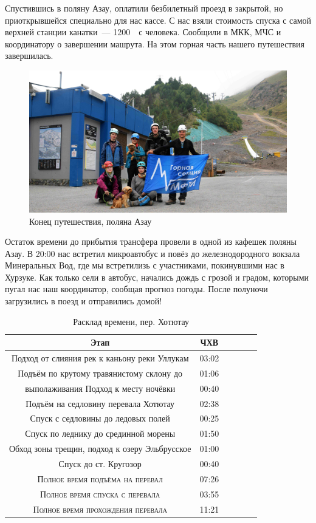 Спустившись в поляну Азау, оплатили безбилетный проезд в закрытой, но приоткрывшейся специально для нас кассе. С нас взяли стоимость спуска с самой верхней станции канатки~--- 1200~\faRub~с человека. Сообщили в МКК, МЧС и координатору о завершении машрута. На этом горная часть нашего путешествия завершилась.

\begin{figure}[h!]
	\centering
	\includegraphics[width=0.7\linewidth]{../pics/group_finish.jpg}
	\caption{Конец путешествия, поляна Азау}
	\label{fig:group_finish}
\end{figure}

Остаток времени до прибытия трансфера провели в одной из кафешек поляны Азау.
В 20:00 нас встретил микроавтобус и повёз до железнодородного вокзала Минеральных Вод, где мы встретилизь с участниками, покинувшими нас в Хурзуке. Как только сели в автобус, начались дождь с грозой и градом, которыми пугал нас наш координатор, сообщая прогноз погоды. После полуночи загрузились в поезд и отправились домой!


\begin{table}[h!]
	\centering
	\begin{tabular}{|c|c|c|c|c|c|} 
		\hline 
		Этап & ЧХВ \\ 	
		\hline 
		Подход от слияния рек к каньону реки Уллукам		& 03:02\\
		Подъём по крутому травянистому склону до& 01:06 \\ выполаживания 
		Подход к месту ночёвки & 00:40 \\
		Подъём на седловину перевала Хотютау & 02:38\\
		Спуск с седловины до ледовых полей& 00:25\\
		Спуск по леднику до срединной морены & 01:50\\
		Обход зоны трещин, подход к озеру Эльбрусское& 01:00\\
		Спуск до ст. Кругозор & 00:40 \\
			
		\hline
		\textsc{Полное время подъёма на перевал  }& 07:26\\
		\textsc{Полное время спуска с перевала }& 03:55 \\
		\textsc{Полное время прохождения перевала }& 11:21 \\
		\hline
	\end{tabular}
	\caption{Расклад времени, пер. Хотютау}
\end{table}

